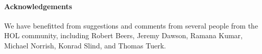 
\paragraph{Acknowledgements}

We have benefitted from suggestions and comments 
from several people from the HOL
community, including Robert Beers, Jeremy Dawson,
Ramana Kumar,
Michael Norrish, 
Konrad Slind, and
Thomas Tuerk.

